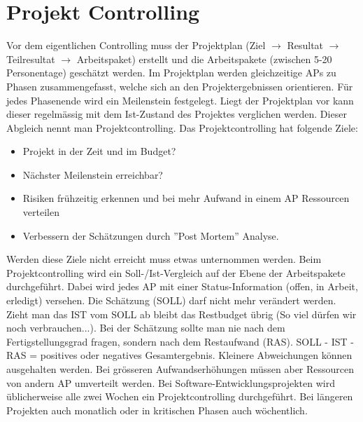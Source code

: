 \chapter{Projekt Controlling}

Vor dem eigentlichen Controlling muss der Projektplan (Ziel $\rightarrow$ Resultat $\rightarrow$ Teilresultat $\rightarrow$ Arbeitspaket) erstellt und die Arbeitspakete (zwischen 5-20 Personentage) geschätzt werden. Im Projektplan werden gleichzeitige APs zu Phasen zusammengefasst, welche sich an den Projektergebnissen orientieren. Für jedes Phasenende wird ein Meilenstein festgelegt. 
Liegt der Projektplan vor kann dieser regelmässig mit dem Ist-Zustand des Projektes verglichen werden. Dieser Abgleich nennt man Projektcontrolling. Das Projektcontrolling hat folgende Ziele:
\begin{itemize}
	\item Projekt in der Zeit und im Budget?
	\item Nächster Meilenstein erreichbar?
	\item Risiken frühzeitig erkennen und bei mehr Aufwand in einem AP Ressourcen verteilen
	\item Verbessern der Schätzungen durch ''Post Mortem'' Analyse.
\end{itemize}
Werden diese Ziele nicht erreicht muss etwas unternommen werden. Beim Projektcontrolling wird ein Soll-/Ist-Vergleich auf der Ebene der Arbeitspakete durchgeführt. Dabei wird jedes AP mit einer Status-Information (offen, in Arbeit, erledigt) versehen. Die Schätzung (SOLL) darf nicht mehr verändert werden. Zieht man das IST vom SOLL ab bleibt das Restbudget übrig (So viel dürfen wir noch verbrauchen...). Bei der Schätzung sollte man nie nach dem Fertigstellungsgrad fragen, sondern nach dem Restaufwand (RAS). SOLL - IST - RAS = positives oder negatives Gesamtergebnis. Kleinere Abweichungen können ausgehalten werden. Bei grösseren Aufwandserhöhungen müssen aber Ressourcen von andern AP umverteilt werden. Bei Software-Entwicklungsprojekten wird üblicherweise alle zwei Wochen ein Projektcontrolling durchgeführt. Bei längeren Projekten auch monatlich oder in kritischen Phasen auch wöchentlich.
